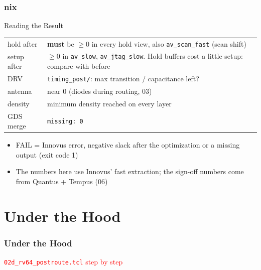 \documentclass{beamer}
\newcommand{\astitle}{nix}
\newcommand{\assubtitle}{nix}
\newcommand{\cmd}[1]{\texttt{#1}}
\begin{document}
\renewcommand{\assubtitle}{Reading the Result}
\begin{frame}
\frametitle{\astitle}
\begin{block}{\assubtitle}
  \footnotesize
  \begin{tabularx}{\linewidth}{@{}lY@{}}
    hold after  & \textbf{must} be $\geq 0$ in every hold view, also
                  \cmd{av\_scan\_fast} (scan shift)\\[2pt]
    setup after & $\geq 0$ in \cmd{av\_slow}, \cmd{av\_jtag\_slow}. Hold
                  buffers cost a little setup: compare with before\\[2pt]
    DRV         & \cmd{timing\_post/}: max transition / capacitance left?\\[2pt]
    antenna     & near 0 (diodes during routing, 03)\\[2pt]
    density     & minimum density reached on every layer\\[2pt]
    GDS merge   & \cmd{missing: 0}\\
  \end{tabularx}
  \vspace{4pt}
  \begin{itemize}
    \item FAIL = Innovus error, negative slack after the optimization or
      a missing output (exit code 1)
    \item The numbers here use Innovus' fast extraction; the sign-off
      numbers come from Quantus + Tempus (06)
  \end{itemize}
\end{block}
\end{frame}

\section{Under the Hood}
\renewcommand{\astitle}{Under the Hood}
\begin{frame}
\frametitle{\astitle}
\textcolor{red}{\cmd{02d\_rv64\_postroute.tcl} step by step}
\end{frame}
\end{document}
